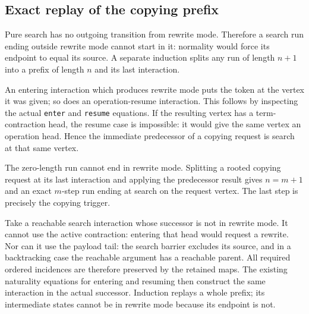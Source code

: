 



\subsection{Exact replay of the copying prefix}

Pure search has no outgoing transition from rewrite mode. Therefore a search
run ending outside rewrite mode cannot start in it: normality would force
its endpoint to equal its source. A separate induction splits any run of
length $n+1$ into a prefix of length $n$ and its last interaction.



An entering interaction which produces rewrite mode puts the token at the
vertex it was given; so does an operation-resume interaction. This follows
by inspecting the actual \texttt{enter} and \texttt{resume} equations. If the
resulting vertex has a term-contraction head, the resume case is impossible:
it would give the same vertex an operation head. Hence the immediate
predecessor of a copying request is search at that same vertex.




The zero-length run cannot end in rewrite mode. Splitting a rooted copying
request at its last interaction and applying the predecessor result gives
$n=m+1$ and an exact $m$-step run ending at search on the request vertex.
The last step is precisely the copying trigger.


Take a reachable search interaction whose successor is not in rewrite
mode. It cannot use the active contraction: entering that head would request
a rewrite. Nor can it use the payload tail: the search barrier excludes its
source, and in a backtracking case the reachable argument has a reachable
parent. All required ordered incidences are therefore preserved by the
retained maps. The existing naturality equations for entering and resuming
then construct the same interaction in the actual successor. Induction
replays a whole prefix; its intermediate states cannot be in rewrite mode
because its endpoint is not.

